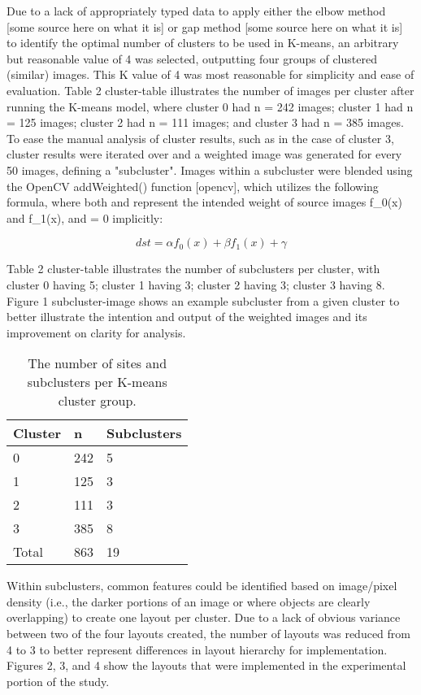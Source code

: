 Due to a lack of appropriately typed data to apply either the elbow method [some source here on what it is] or gap method [some source here on what it is] to identify the optimal number of clusters to be used in K-means, an arbitrary but reasonable value of 4 was selected, outputting four groups of clustered (similar) images. This K value of 4 was most reasonable for simplicity and ease of evaluation. Table 2 {cluster-table} illustrates the number of images per cluster after running the K-means model, where cluster 0 had n = 242 images; cluster 1 had n = 125 images; cluster 2 had n = 111 images; and cluster 3 had n = 385 images. To ease the manual analysis of cluster results, such as in the case of cluster 3, cluster results were iterated over and a weighted image was generated for every 50 images, defining a "subcluster". Images within a subcluster were blended using the OpenCV addWeighted() function [opencv], which utilizes the following formula, where both \alpha and \beta represent the intended weight of source images f_0(x) and f_1(x), and \gamma = 0 implicitly:

\[dst = \alpha f_0(x) + \beta f_1(x) + \gamma\]

Table 2 {cluster-table} illustrates the number of subclusters per cluster, with cluster 0 having 5; cluster 1 having 3; cluster 2 having 3; cluster 3 having 8. Figure 1 {subcluster-image} shows an example subcluster from a given cluster to better illustrate the intention and output of the weighted images and its improvement on clarity for analysis.

\begin{table}[]
\caption{The number of sites and subclusters per K-means cluster group.}
\label{tab:my-table}
\begin{tabular}{@{}lll@{}}
\toprule
Cluster & n   & Subclusters \\ \midrule
0       & 242 & 5           \\
1       & 125 & 3           \\
2       & 111 & 3           \\
3       & 385 & 8           \\ \bottomrule
Total  &  863 & 19          \\ \bottomrule
\end{tabular}
\end{table}

Within subclusters, common features could be identified based on image/pixel density (i.e., the darker portions of an image or where objects are clearly overlapping) to create one layout per cluster. Due to a lack of obvious variance between two of the four layouts created, the number of layouts was reduced from 4 to 3 to better represent differences in layout hierarchy for implementation. Figures 2, 3, and 4 show the layouts that were implemented in the experimental portion of the study.

